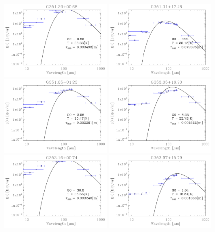 \begin{figure}[!htb]
\centering
\includegraphics[trim=-1mm -1mm -1mm -1mm, clip, width=55mm]{appB/appB_90.pdf}
\includegraphics[trim=-1mm -1mm -1mm -1mm, clip, width=55mm]{appB/appB_91.pdf}
\includegraphics[trim=-1mm -1mm -1mm -1mm, clip, width=55mm]{appB/appB_92.pdf}
\includegraphics[trim=-1mm -1mm -1mm -1mm, clip, width=55mm]{appB/appB_93.pdf}
\includegraphics[trim=-1mm -1mm -1mm -1mm, clip, width=55mm]{appB/appB_94.pdf}
\includegraphics[trim=-1mm -1mm -1mm -1mm, clip, width=55mm]{appB/appB_95.pdf}

\end{figure}
